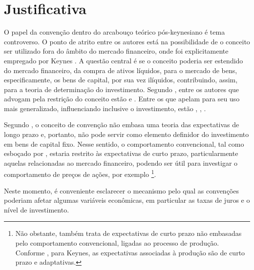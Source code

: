 \clearpage



\section{Justificativa}

O papel da convenção dentro do arcabouço teórico pós-keynesiano é tema controverso. O ponto de atrito entre os autores está na possibilidade de o conceito ser utilizado fora do âmbito do mercado financeiro, onde foi explicitamente empregado por Keynes \parencite{dequech_conventions_2022}. A questão central é se o conceito poderia ser estendido do mercado financeiro, da compra de ativos líquidos, para o mercado de bens, especificamente, os bens de capital, por sua vez ilíquidos, contribuindo, assim, para a teoria de determinação do investimento. Segundo \textcite{dequech_conventions_2022}, entre os autores que advogam pela restrição do conceito estão \textcite{possas_racionalidade_2016} e \textcite{carvalho_keynes_2020}. Entre os que apelam para seu uso mais generalizado, influenciando inclusive o investimento, estão \textcite{odonnell_keynes_1991}, \textcite{meeks_keynes_2003}, \textcite{dow_keynes_2013}.  

Segundo \textcite[p. 160]{carvalho_keynes_2020}, o conceito de convenção não embasa uma teoria das expectativas de longo prazo e, portanto, não pode servir como elemento definidor do investimento em bens de capital fixo. Nesse sentido, o comportamento convencional, tal como esboçado por 
\textcite{keynes_general_1937, keynes_teoria_1996}, estaria restrito às expectativas de curto prazo, particularmente aquelas relacionadas ao mercado financeiro, podendo ser útil para investigar o comportamento de preços de ações, por exemplo
\footnote{Não obstante, \textcite[Cap. 5]{keynes_teoria_1996} também trata de expectativas de curto prazo não embasadas pelo comportamento convencional, ligadas ao processo de produção. Conforme \textcite{carvalho_expectativas_2014}, para Keynes, as expectativas associadas à produção são de curto prazo e adaptativas.}.

Neste momento, é conveniente esclarecer o mecanismo pelo qual as convenções poderiam afetar algumas variáveis econômicas, em particular as taxas de juros e o nível de investimento. 


